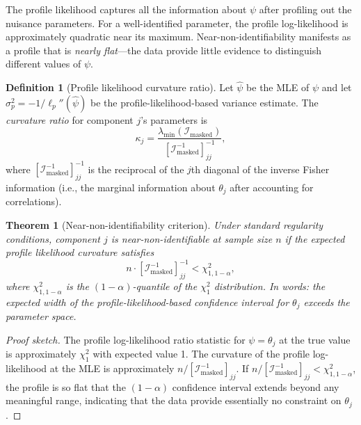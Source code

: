 \documentclass[11pt]{article}
\theoremstyle{definition}
\newtheorem{definition}{Definition}
\theoremstyle{plain}
\newtheorem{theorem}{Theorem}
\newcommand{\FI}{\mathcal{I}}       %
\begin{document}
The profile likelihood captures all the information about $\psi$
after profiling out the nuisance parameters.
For a well-identified parameter, the profile log-likelihood is
approximately quadratic near its maximum.
Near-non-identifiability manifests as a profile that is
\emph{nearly flat}---the data provide little evidence to distinguish
different values of $\psi$.

\begin{definition}[Profile likelihood curvature ratio]
\label{def:ridge-ratio}
Let $\hat{\psi}$ be the MLE of $\psi$ and let
$\sigma^2_p = -1/\ell_p''(\hat{\psi})$ be the profile-likelihood-based
variance estimate.
The \emph{curvature ratio} for component $j$'s parameters is
\begin{equation}
\label{eq:curvature-ratio}
    \kappa_j = \frac{\lambda_{\min}(\FI_{\mathrm{masked}})}
                    {[\FI_{\mathrm{masked}}^{-1}]_{jj}^{-1}},
\end{equation}
where $[\FI_{\mathrm{masked}}^{-1}]_{jj}^{-1}$ is the reciprocal
of the $j$th diagonal of the inverse Fisher information
(i.e., the marginal information about $\theta_j$ after accounting
for correlations).
\end{definition}

\begin{theorem}[Near-non-identifiability criterion]
\label{thm:near-nonid}
Under standard regularity conditions, component $j$ is
\emph{near-non-identifiable} at sample size $n$ if the
expected profile likelihood curvature satisfies
\begin{equation}
\label{eq:near-nonid}
    n \cdot [\FI_{\mathrm{masked}}^{-1}]_{jj}^{-1}
    < \chi^2_{1,1-\alpha},
\end{equation}
where $\chi^2_{1,1-\alpha}$ is the $(1-\alpha)$-quantile of the
$\chi^2_1$ distribution.
In words: the expected width of the profile-likelihood-based
confidence interval for $\theta_j$ exceeds the parameter space.
\end{theorem}

\begin{proof}[Proof sketch]
The profile log-likelihood ratio statistic for $\psi = \theta_j$ at
the true value is approximately $\chi^2_1$ with expected value 1.
The curvature of the profile log-likelihood at the MLE is approximately
$n / [\FI_{\mathrm{masked}}^{-1}]_{jj}$.
If $n / [\FI_{\mathrm{masked}}^{-1}]_{jj} < \chi^2_{1,1-\alpha}$,
the profile is so flat that the $(1-\alpha)$ confidence interval
extends beyond any meaningful range, indicating that the data
provide essentially no constraint on $\theta_j$.
\end{proof}
\end{document}
